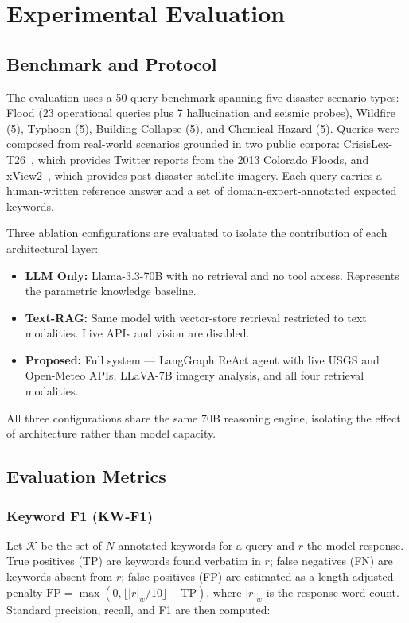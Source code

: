 \section{Experimental Evaluation}

\subsection{Benchmark and Protocol}

The evaluation uses a 50-query benchmark spanning five disaster scenario types:
Flood (23 operational queries plus 7 hallucination and seismic probes),
Wildfire (5), Typhoon (5), Building Collapse (5), and Chemical Hazard (5).
Queries were composed from real-world scenarios grounded in two public
corpora: CrisisLex-T26~\cite{b21}, which provides Twitter reports from the
2013 Colorado Floods, and xView2~\cite{b22}, which provides post-disaster
satellite imagery. Each query carries a human-written reference answer and a
set of domain-expert-annotated expected keywords.

Three ablation configurations are evaluated to isolate the contribution of
each architectural layer:
\begin{itemize}
  \item \textbf{LLM Only:} Llama-3.3-70B with no retrieval and no tool
        access. Represents the parametric knowledge baseline.
  \item \textbf{Text-RAG:} Same model with vector-store retrieval restricted
        to text modalities. Live APIs and vision are disabled.
  \item \textbf{Proposed:} Full system — LangGraph ReAct agent with live
        USGS and Open-Meteo APIs, LLaVA-7B imagery analysis, and all four
        retrieval modalities.
\end{itemize}
All three configurations share the same 70B reasoning engine, isolating the
effect of architecture rather than model capacity.

\subsection{Evaluation Metrics}

\subsubsection{Keyword F1 (KW-F1)}
Let $\mathcal{K}$ be the set of $N$ annotated keywords for a query and $r$
the model response. True positives (TP) are keywords found verbatim in $r$;
false negatives (FN) are keywords absent from $r$; false positives (FP) are
estimated as a length-adjusted penalty $\text{FP} = \max(0, \lfloor |r|_w /
10 \rfloor - \text{TP})$, where $|r|_w$ is the response word count.
Standard precision, recall, and F1 are then computed:

